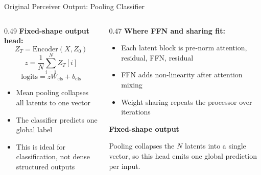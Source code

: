 \documentclass[aspectratio=169,11pt]{beamer}
\newcommand{\colhead}[1]{{\color{HeadBlue}\bfseries #1}\par\vspace{0.25em}}
\begin{document}
\begin{frame}[shrink=5]{Original Perceiver Output: Pooling Classifier}
  \begin{columns}[T]
    \begin{column}{0.49\textwidth}
      \textbf{Fixed-shape output head:}
      \[
        Z_T=\mathrm{Encoder}(X,Z_0)
      \]
      \[
        z=\frac{1}{N}\sum_{i=1}^{N}Z_T[i]
      \]
      \[
        \mathrm{logits}=zW_{\mathrm{cls}}+b_{\mathrm{cls}}
      \]

      \vspace{0.4em}
      \begin{itemize}
        \item Mean pooling collapses all latents to one vector
        \item The classifier predicts one global label
        \item This is ideal for classification, not dense structured outputs
      \end{itemize}
    \end{column}
    \begin{column}{0.47\textwidth}
      \small
      \textbf{Where FFN and sharing fit:}
      \begin{itemize}
        \item Each latent block is pre-norm attention, residual, FFN, residual
        \item FFN adds non-linearity after attention mixing
        \item Weight sharing repeats the processor over iterations
      \end{itemize}

      \vspace{0.35em}
      \colhead{Fixed-shape output}
        Pooling collapses the $N$ latents into a single vector, so this head emits one global prediction per input.
      
    \end{column}
  \end{columns}
\end{frame}
\end{document}
